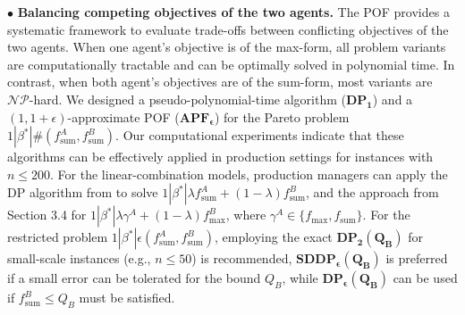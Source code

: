 \documentclass[12pt]{article}
\begin{document}
\begin{sloppypar}
$\bullet$ \textbf{Balancing competing objectives of the two agents.} The POF provides a systematic framework to evaluate trade-offs between conflicting objectives of the two agents. When one agent’s objective is of the max-form, all problem variants are computationally tractable and can be optimally solved in polynomial time. In contrast, when both agent’s objectives are of the sum-form, most variants are $\mathcal{NP}$-hard. We designed a pseudo-polynomial-time algorithm ($\mathbf{DP_1}$) and a $(1, 1+\epsilon)$-approximate POF ($\mathbf{APF_{\epsilon}}$) for the Pareto problem $1 | \beta^{*}|\#(f_{\mathrm{sum}}^A, f_{\mathrm{sum}}^B)$. Our computational experiments indicate that these algorithms can be effectively applied in production settings for instances with $n \leq 200$. For the linear-combination models, production managers can apply the DP algorithm from \cite{ChengYuanYang2005COR} to solve $1|\beta^{*}|\lambda f_{\mathrm{sum}}^{A}+(1-\lambda) f_{\mathrm{sum}}^{B}$, and the approach from Section 3.4 for $1 | \beta^{*} |\lambda \gamma^A +(1-\lambda) f_{\max}^B$, where $\gamma^A \in \{f_{\max}, f_{\mathrm{sum}}\}$. For the restricted problem $1 | \beta^{*}|\epsilon(f_{\mathrm{sum}}^A, f_{\mathrm{sum}}^B)$, employing the exact $\mathbf{DP_2(Q_B)}$ for small-scale instances (e.g., $n \leq 50$) is recommended, $\mathbf{SDDP_{\epsilon}(Q_B)}$ is preferred if a small error can be tolerated for the bound $Q_B$, while $\mathbf{DP_{\epsilon}(Q_B)}$ can be used if $f_{\mathrm{sum}}^B \leq Q_B$ must be satisfied.


\end{sloppypar}
\end{document}
